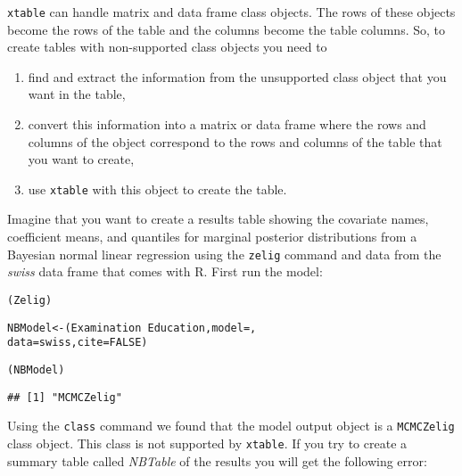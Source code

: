 {\tt{xtable}} can handle matrix and data frame class objects. The rows of these objects become the rows of the table and the columns become the table columns. So, to create tables with non-supported class objects you need to

\begin{enumerate}
    \item find and extract the information from the unsupported class object that you want in the table, 
    \item convert this information into a matrix or data frame where the rows and columns of the object correspond to the rows and columns of the table that you want to create,
    \item use {\tt{xtable}} with this object to create the table.
\end{enumerate}

Imagine that you want to create a results table showing the covariate names, coefficient means, and quantiles for marginal posterior distributions from a Bayesian normal linear regression using the {\tt{zelig}} command \cite[]{Goodrich2007,R-Zelig} and data from the {\emph{swiss}} data frame that comes with R. First run the model:


\begin{knitrout}
\color{fgcolor}\begin{kframe}
\begin{alltt}
(Zelig)

NBModel <- (Examination ~ Education, model = , 
                    data = swiss, cite = FALSE)

(NBModel)
\end{alltt}
\begin{verbatim}
## [1] "MCMCZelig"
\end{verbatim}
\end{kframe}
\end{knitrout}


Using the {\tt{class}} command we found that the model output object is a {\tt{MCMCZelig}} class object. This class is not supported by {\tt{xtable}}. If you try to create a summary table called {\emph{NBTable}} of the results you will get the following error:

